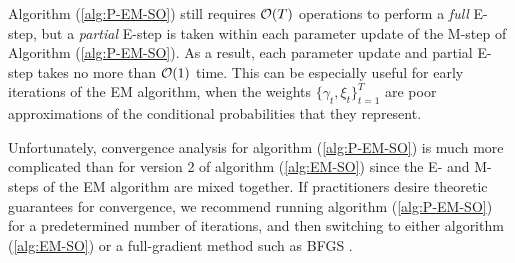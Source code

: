 Algorithm (\ref{alg:P-EM-SO}) still requires $\mathcal{O}(T)$ operations to perform a \textit{full} E-step, but a \textit{partial} E-step is taken within each parameter update of the M-step of Algorithm (\ref{alg:P-EM-SO}). As a result, each parameter update and partial E-step takes no more than $\mathcal{O}(1)$ time. This can be especially useful for early iterations of the EM algorithm, when the weights $\{\gamma_t,\xi_t\}_{t=1}^T$ are poor approximations of the conditional probabilities that they represent.


Unfortunately, convergence analysis for algorithm (\ref{alg:P-EM-SO}) is much more complicated than for version 2 of algorithm (\ref{alg:EM-SO}) since the E- and M- steps of the EM algorithm are mixed together. If practitioners desire theoretic guarantees for convergence, we recommend running algorithm (\ref{alg:P-EM-SO}) for a predetermined number of iterations, and then switching to either algorithm (\ref{alg:EM-SO}) or a full-gradient method such as BFGS \citep{Fletcher:2000}.




